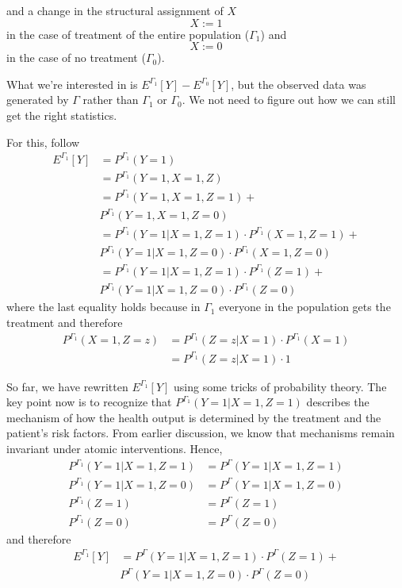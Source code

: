 \documentclass[
]{book}
\theoremstyle{definition}
\theoremstyle{definition}
\theoremstyle{definition}
\theoremstyle{remark}
\begin{document}
and a change in the structural assignment of \(X\)
\begin{equation}
X := 1
\end{equation}
in the case of treatment of the entire population (\(\Gamma_1\)) and
\begin{equation}
X := 0
\end{equation}
in the case of no treatment (\(\Gamma_0\)).

What we're interested in is \(E^{\Gamma_1}[Y] - E^{\Gamma_0}[Y]\), but the observed data was generated by \(\Gamma\) rather than \(\Gamma_1\) or \(\Gamma_0\). We not need to figure out how we can still get the right statistics.

For this, follow
\begin{align*}
E^{\Gamma_1}[Y] &= P^{\Gamma_1}(Y = 1) \\
                &= P^{\Gamma_1}(Y = 1, X = 1, Z) \\
                &= P^{\Gamma_1}(Y = 1, X = 1, Z = 1) + \\
                &  P^{\Gamma_1}(Y = 1, X = 1, Z = 0) \\
                &= P^{\Gamma_1}(Y = 1 | X = 1, Z = 1) \cdot P^{\Gamma_1}(X = 1, Z = 1) + \\
                &  P^{\Gamma_1}(Y = 1 | X = 1, Z = 0) \cdot P^{\Gamma_1}(X = 1, Z = 0) \\
                &= P^{\Gamma_1}(Y = 1 | X = 1, Z = 1) \cdot P^{\Gamma_1}(Z = 1) + \\
                &  P^{\Gamma_1}(Y = 1 | X = 1, Z = 0) \cdot P^{\Gamma_1}(Z = 0)
\end{align*}
where the last equality holds because in \(\Gamma_1\) everyone in the population gets the treatment and therefore
\begin{align*}
P^{\Gamma_1}(X = 1, Z = z) &= P^{\Gamma_1}(Z = z | X = 1) \cdot P^{\Gamma_1}(X = 1) \\
                           &= P^{\Gamma_1}(Z = z | X = 1) \cdot 1
\end{align*}

So far, we have rewritten \(E^{\Gamma_1}[Y]\) using some tricks of probability theory. The key point now is to recognize that \(P^{\Gamma_1}(Y = 1 | X = 1, Z = 1)\) describes the mechanism of how the health output is determined by the treatment and the patient's risk factors. From earlier discussion, we know that mechanisms remain invariant under atomic interventions. Hence,
\begin{align*}
P^{\Gamma_1}(Y = 1 | X = 1, Z = 1) &= P^{\Gamma}(Y = 1 | X = 1, Z = 1) \\
P^{\Gamma_1}(Y = 1 | X = 1, Z = 0) &= P^{\Gamma}(Y = 1 | X = 1, Z = 0) \\
P^{\Gamma_1}(Z = 1)                &= P^{\Gamma}(Z = 1)                \\
P^{\Gamma_1}(Z = 0)                &= P^{\Gamma}(Z = 0)
\end{align*}
and therefore
\begin{align*}
E^{\Gamma_1}[Y] &= P^{\Gamma}(Y = 1 | X = 1, Z = 1) \cdot P^{\Gamma}(Z = 1) + \\
                &  P^{\Gamma}(Y = 1 | X = 1, Z = 0) \cdot P^{\Gamma}(Z = 0)
\end{align*}
\end{document}
